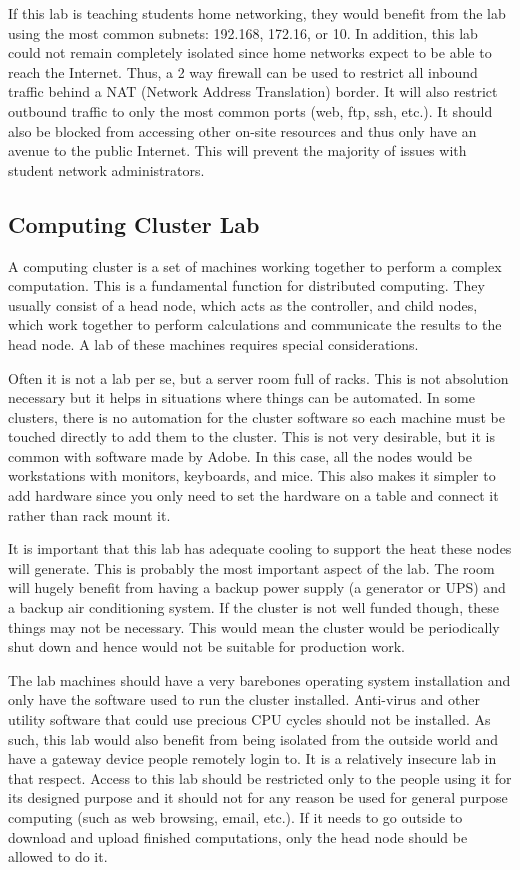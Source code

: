 If this lab is teaching students home networking, they would benefit from the lab using the most common subnets:  192.168, 172.16, or 10.  In addition, this lab could not remain completely isolated since home networks expect to be able to reach the Internet.  Thus, a 2 way firewall can be used to restrict all inbound traffic behind a NAT (Network Address Translation) border.  It will also restrict outbound traffic to only the most common ports (web, ftp, ssh, etc.).  It should also be blocked from accessing other on-site resources and thus only have an avenue to the public Internet.  This will prevent the majority of issues with student network administrators.   
\subsection{Computing Cluster Lab}
A computing cluster is a set of machines working together to perform a complex computation.  This is a fundamental function for distributed computing.  They usually consist of a head node, which acts as the controller, and child nodes, which work together to perform calculations and communicate the results to the head node.  A lab of these machines requires special considerations.  

Often it is not a lab per se, but a server room full of racks.  This is not absolution necessary but it helps in situations where things can be automated.  In some clusters, there is no automation for the cluster software so each machine must be touched directly to add them to the cluster.  This is not very desirable, but it is common with software made by Adobe.  In this case, all the nodes would be workstations with monitors, keyboards, and mice.  This also makes it simpler to add hardware since you only need to set the hardware on a table and connect it rather than rack mount it.  

It is important that this lab has adequate cooling to support the heat these nodes will generate.  This is probably the most important aspect of the lab.  The room will hugely benefit from having a backup power supply (a generator or UPS) and a backup air conditioning system.  If the cluster is not well funded though, these things may not be necessary.  This would mean the cluster would be periodically shut down and hence would not be suitable for production work.  

The lab machines should have a very barebones operating system installation and only have the software used to run the cluster installed.  Anti-virus and other utility software that could use precious CPU cycles should not be installed.  As such, this lab would also benefit from being isolated from the outside world and have a gateway device people remotely login to.  It is a relatively insecure lab in that respect.  Access to this lab should be restricted only to the people using it for its designed purpose and it should not for any reason be used for general purpose computing (such as web browsing, email, etc.).  If it needs to go outside to download and upload finished computations, only the head node should be allowed to do it.  

